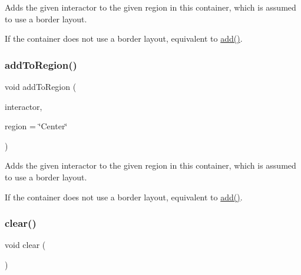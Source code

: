 Adds the given interactor to the given region in this container, which is assumed to use a border layout. 

If the container does not use a border layout, equivalent to \mbox{\hyperlink{classsgl_1_1GContainer_a6f99b7c841256dbdc5acaafbbca4e685}{add()}}. \mbox{\label{classsgl_1_1GContainer_a667ed0065e0bbb52a893904e7f2383bb}} 
\subsubsection{\texorpdfstring{add\+To\+Region()}{addToRegion()}\hspace{0.1cm}{\footnotesize\ttfamily [4/4]}}
{\footnotesize\ttfamily void add\+To\+Region (\begin{DoxyParamCaption}\item[{\mbox{\hyperlink{classsgl_1_1GInteractor}{G\+Interactor}} \&}]{interactor,  }\item[{const std\+::string \&}]{region = {\ttfamily \char`\"{}Center\char`\"{}} }\end{DoxyParamCaption})\hspace{0.3cm}{\ttfamily [virtual]}}



Adds the given interactor to the given region in this container, which is assumed to use a border layout. 

If the container does not use a border layout, equivalent to \mbox{\hyperlink{classsgl_1_1GContainer_a6f99b7c841256dbdc5acaafbbca4e685}{add()}}. \mbox{\label{classsgl_1_1GContainer_ac8bb3912a3ce86b15842e79d0b421204}} 
\subsubsection{\texorpdfstring{clear()}{clear()}}
{\footnotesize\ttfamily void clear (\begin{DoxyParamCaption}{ }\end{DoxyParamCaption})\hspace{0.3cm}{\ttfamily [virtual]}}



